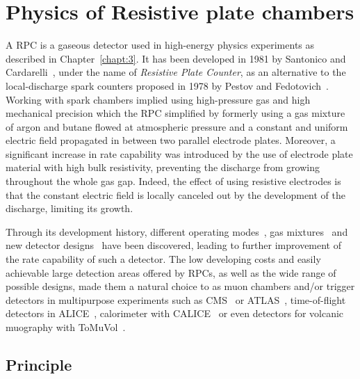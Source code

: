\renewcommand\evenpagerightmark{{\scshape\small Chapter 4}}
\renewcommand\oddpageleftmark{{\scshape\small Amplification processes in gaseous detectors}}

\renewcommand{\bibname}{References}

\hyphenation{}

\chapter[Physics of Resistive plate chambers]%
{Physics of Resistive plate chambers}
\label{chapt4}

A \acf{RPC} is a gaseous detector used in high-energy physics experiments as described in Chapter~\ref{chapt:3}. It has been developed in 1981 by Santonico and Cardarelli~\cite{SANTONICO81}, under the name of \textit{Resistive Plate Counter}, as an alternative to the local-discharge spark counters proposed in 1978 by Pestov and Fedotovich~\cite{PESTOV78,FEDOTOVICH82}. Working with spark chambers implied using high-pressure gas and high mechanical precision which the RPC simplified by formerly using a gas mixture of argon and butane flowed at atmospheric pressure and a constant and uniform electric field propagated in between two parallel electrode plates. Moreover, a significant increase in rate capability was introduced by the use of electrode plate material with high bulk resistivity, preventing the discharge from growing throughout the whole gas gap. Indeed, the effect of using resistive electrodes is that the constant electric field is locally canceled out by the development of the discharge, limiting its growth.
	
	Through its development history, different operating modes~\cite{CROTTY93,CROTTY94,CARDARELLI96}, gas mixtures~\cite{SANTONICO81,CARDARELLI93,CARDARELLI96,ABBRESCIA1997PERF,ABBRESCIA1997,CAMARRI98,ZEBALLOS98} and new detector designs~\cite{ZEBALLOS96MRPC,WILLIAMS98,CZYRKOWSKI98} have been discovered, leading to further improvement of the rate capability of such a detector. The low developing costs and easily achievable large detection areas offered by RPCs, as well as the wide range of possible designs, made them a natural choice to as muon chambers and/or trigger detectors in multipurpose experiments such as CMS~\cite{MUONTDR} or ATLAS~\cite{ATLASTDR}, time-of-flight detectors in ALICE~\cite{ALICETDR}, calorimeter with CALICE~\cite{CALICE2016} or even detectors for volcanic muography with ToMuVol~\cite{TOMUVOL2011}. 

\section{Principle}
\label{chapt4:sec:principle}

